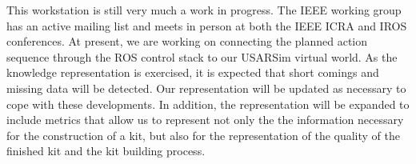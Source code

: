 \documentclass[a4paper, 10pt, conference]{ieeeconf}      %
\begin{document}
This workstation is still very much a work in progress. The IEEE working group has an active mailing list and meets in person at both the IEEE ICRA and IROS conferences.
At present, we are working on connecting the planned action sequence through the ROS control stack to our USARSim virtual world. As the knowledge representation is
exercised, it is expected that short comings and missing data will be detected. Our representation will be updated as necessary to cope with these developments. In addition,
the representation will be expanded to include metrics that allow us to represent not only the the information necessary for the construction of a kit, but also for the representation
of the quality of the finished kit and the kit building process.



\end{document}
